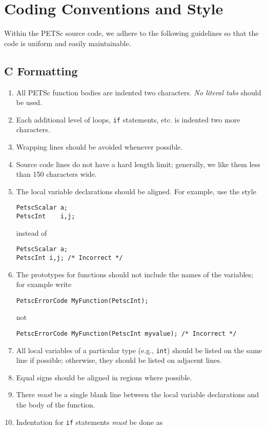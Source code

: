 \section{Coding Conventions and Style}
Within the PETSc source code, we adhere to the following guidelines
so that the code is uniform and easily maintainable.

\subsection{C Formatting}
\begin{enumerate}
  \item All PETSc function bodies are indented two characters. {\em No literal tabs} should be used.
\item Each additional level of loops, \lstinline{if} statements, etc. is indented
      two more characters.
\item Wrapping lines should be avoided whenever possible.
\item Source code lines do not have a hard length limit; generally, we like them less than 150 characters wide.
\item The local variable declarations should be aligned. For example,
      use the style 
\begin{lstlisting}
PetscScalar a;
PetscInt    i,j;
\end{lstlisting}
instead of
\begin{lstlisting}
PetscScalar a;
PetscInt i,j; /* Incorrect */
\end{lstlisting}
\item The prototypes for functions should not include the names of the variables; for example write
\begin{lstlisting}
PetscErrorCode MyFunction(PetscInt);
\end{lstlisting}
not
\begin{lstlisting}
PetscErrorCode MyFunction(PetscInt myvalue); /* Incorrect */
\end{lstlisting}
\item All local variables of a particular type (e.g., \lstinline{int}) should be
      listed on the same line if possible; otherwise, they should be listed
      on adjacent lines.
\item Equal signs should be aligned in regions where possible.
\item There {\em must} be a single blank line
      between the local variable declarations and the body of the function.
\item Indentation for \lstinline{if} statements {\em must}  be done  as

\end{enumerate}
